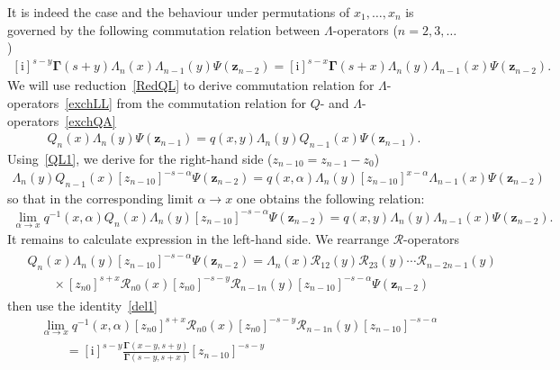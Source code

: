 \documentclass[10pt,a4paper]{amsart}
\renewcommand{\imath}{\mathrm{i}}
\numberwithin{equation}{section}
\begin{document}
It is indeed the case and the behaviour under permutations of $x_1, \dots, x_n$ is governed by the following
commutation relation between $\Lambda$-operators ($n=2 ,3 ,\dots$)
\begin{align} \label{exchLL}
[\imath]^{s-y} \mathbf{\Gamma}(s+y)
\Lambda_n(x) \Lambda_{n-1}(y) \Psi(\bm z_{n-2}) =
[\imath]^{s-x} \mathbf{\Gamma}(s+x)
\Lambda_n(y) \Lambda_{n-1}(x) \Psi(\bm z_{n-2}) .
\end{align}
We will use reduction~\eqref{RedQL} to derive commutation relation for $\Lambda$-operators~\eqref{exchLL} from the
commutation relation for $Q$- and $\Lambda$-operators~\eqref{exchQA}
\begin{align*}
Q_n( x) \Lambda_{n}( y) \Psi(\bm z_{n-1}) =
q(x,y) \Lambda_{n}( y) Q_{n-1}( x) \Psi(\bm z_{n-1}) .
\end{align*}
Using~\eqref{QL1}, we derive for the right-hand side ($z_{n-1 0} = z_{n-1} - z_0$)
\begin{align*}
\Lambda_n( y) Q_{n-1}( x) [z_{n-1 0}]^{-s-\alpha} \Psi(\bm z_{n-2}) =
q(x,\alpha) \Lambda_n( y) [z_{n-1 0}]^{x-\alpha} \Lambda_{n-1}(x) \Psi(\bm z_{n-2})
\end{align*}
so that in the corresponding limit $\alpha \to x$ one obtains the following relation:
\begin{align*}
\lim\limits_{\alpha\to x}
 q^{-1}(x,\alpha) Q_n(x) \Lambda_n(y)
[z_{n-1 0}]^{-s-\alpha} \Psi(\bm z_{n-2}) =
q(x,y) \Lambda_{n}(y) \Lambda_{n-1}(x) \Psi(\bm z_{n-2}) .
\end{align*}
It remains to calculate expression in the left-hand side.
We rearrange
$\mathcal{R}$-operators
\begin{align*}
\begin{split}
&Q_n(x) \Lambda_n(y)
[z_{n-1 0}]^{-s-\alpha} \Psi(\bm z_{n-2}) =
\Lambda_n(x) \mathcal{R}_{12}(y)\mathcal{R}_{23}(y)\cdots
\mathcal{R}_{n-2 n-1}(y) \\
&\qquad{} \times
[z_{n0}]^{s+x} \mathcal{R}_{n 0}(x) [z_{n0}]^{-s-y}
\mathcal{R}_{n-1 n}(y) [z_{n-1 0}]^{-s-\alpha} \Psi(\bm z_{n-2})
\end{split}
\end{align*}
then use the identity~\eqref{del1}
\begin{align*}
&
\lim\limits_{\alpha\to x}
q^{-1}(x,\alpha)
[z_{n0}]^{s+x} \mathcal{R}_{n 0}(x) [z_{n0}]^{-s-y}
\mathcal{R}_{n-1 n}(y) [z_{n-1 0}]^{-s-\alpha} \\
&
\qquad =
[\imath]^{s-y} \frac{\mathbf{\Gamma}(x-y,s+y)}
{\mathbf{\Gamma}(s-y,s+x)} [z_{n-1 0}]^{-s-y}
\end{align*}
\end{document}
